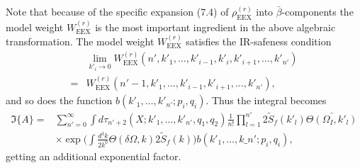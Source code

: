 Note that because of the specific expansion (7.4) of $\rho^{(r)}_\text{EEX}$ into $\bar{\beta}$-components the model weight $W^{(r)}_\text{EEX}$ is the most important ingredient in the above algebraic transformation. The model weight $W^{(r)}_\text{EEX}$ satisfies the IR-safeness condition
\begin{align}
&\lim_{k'_i\to 0}W^{(r)}_\text{EEX}(n',k'_1,\ldots,k'_{i-1},k'_i,k'_{i+1},\ldots,k'_{n'})\nonumber\\
=&W^{(r)}_\text{EEX}(n'-1,k'_1,\ldots,k'_{i-1},k'_{i+1},\ldots,k'_{n'}),
\end{align}
and so does the function $b(k'_1,\ldots,k'_{n'};p_i,q_i)$. Thus the integral becomes
\begin{align}
\mathfrak{I}\{A\}=&\sum_{n'=0}^{\infty}\int d\tau_{n'+2}(X;k'_1,\ldots,k'_{n'},q_1,q_2)\frac{1}{n!}\prod_{l=1}^{n'}2\widetilde{S}_f(k'_l)\bar{\Theta(\Omega_I,k'_l)}\nonumber\\
&\times\exp\biggl(\int\frac{d^3k}{2k^0}\Theta(\delta\Omega,k)2\widetilde{S}_f(k)\biggr)b(k'_1,\ldots,k\_{n'};p_i,q_i),
\end{align}
getting an additional exponential factor. 

